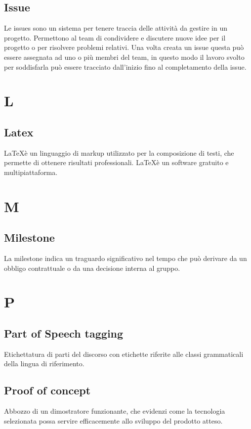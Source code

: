{	\subsection{Issue}
	Le issues sono un sistema per tenere traccia delle attività da gestire in un progetto. Permettono al team di condividere e discutere nuove idee per il progetto o per risolvere problemi relativi. Una volta creata un issue questa può essere assegnata ad uno o più membri del team, in questo modo il lavoro svolto per soddisfarla può essere tracciato dall'inizio fino al completamento della issue.
		
	\section{L}
	\subsection{Latex} 
	\LaTeX è un linguaggio di markup utilizzato per la composizione di testi, che permette di ottenere risultati professionali. \LaTeX è un software gratuito e multipiattaforma.

	\section{M}
	\subsection{Milestone} 
	La milestone indica un traguardo significativo nel tempo che può derivare da un obbligo contrattuale o da una decisione interna al gruppo.

	\section{P}
	\subsection{Part of Speech tagging}
	Etichettatura di parti del discorso con etichette riferite alle classi grammaticali della lingua di riferimento.
	
	\subsection{Proof of concept}
	Abbozzo di un dimostratore funzionante, che evidenzi come la tecnologia selezionata possa servire efficacemente allo sviluppo del prodotto atteso.
	
}

